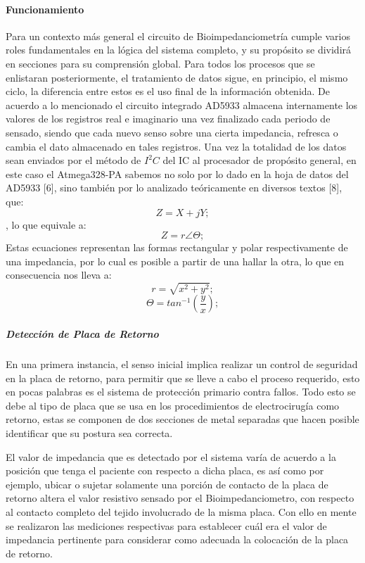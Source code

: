 \documentclass[12pt,letterpaper,spanish]{article}
\begin{document}
				\paragraph{Funcionamiento}
				\hfill\break
Para un contexto más general el circuito de Bioimpedanciometría cumple varios roles fundamentales en la lógica del sistema completo,  y su propósito se dividirá en secciones  para su comprensión global.
Para todos los procesos que se enlistaran posteriormente, el tratamiento de datos sigue, en principio, el mismo ciclo, la diferencia entre estos es el uso final de la información obtenida.
De acuerdo a lo mencionado el circuito integrado AD5933 almacena internamente los valores de los registros real e imaginario una vez finalizado cada periodo de sensado, siendo que cada nuevo senso sobre una cierta impedancia, refresca o cambia el dato almacenado en tales registros.
Una vez la totalidad de los datos sean enviados por el método de $I^{2}C$  del IC al procesador de propósito general, en este caso el Atmega328-PA sabemos no solo por lo dado en la hoja de datos del AD5933 [6], sino también por lo analizado teóricamente en diversos textos [8], que:
$$Z = X+jY;$$, lo que equivale a:  $$Z=r\angle\Theta;$$
Estas ecuaciones representan las formas rectangular y polar respectivamente de una impedancia, por lo cual es posible a partir de una hallar la otra, lo que en consecuencia nos lleva a:
$$r = \sqrt{x^{2}+y^{2}};$$ $$\Theta = tan^{-1}(\dfrac{y}{x});  $$								
			
					\subparagraph{Detección de Placa de Retorno}
					\hfill\break
En una primera instancia, el senso inicial implica realizar un control de seguridad en la placa de retorno, para permitir que se lleve a cabo el proceso requerido, esto en pocas palabras es el sistema de protección primario contra fallos. Todo esto se debe al tipo de placa que se usa en los procedimientos de electrocirugía como retorno, estas se componen de dos secciones de metal separadas que hacen posible identificar que su postura sea correcta.

El valor de impedancia que es detectado por el sistema varía de acuerdo a la posición que tenga el paciente con respecto a dicha placa, es así como por ejemplo, ubicar o sujetar solamente una porción de contacto de la placa de retorno altera el valor resistivo sensado por el Bioimpedanciometro, con respecto al contacto completo del tejido involucrado de la misma placa.  
 Con ello en mente se realizaron las mediciones respectivas para establecer cuál era el valor de impedancia pertinente para considerar como adecuada la colocación de la placa de retorno. 
\end{document}
